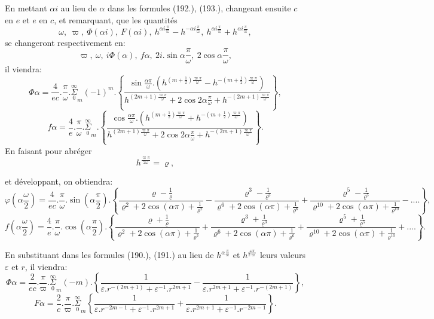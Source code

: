 \documentclass{article}
\begin{document}
En mettant $\alpha i$ au lieu de $\alpha$ dans les formules (192.), (193.), changeant ensuite $c$ en $e$ et $e$ en $c$, et remarquant, que les quantités
\[
\omega,\ \varpi,\ \Phi(\alpha i),\ F(\alpha i),\ h^{\alpha i\frac{\pi}{\varpi}}-h^{-\alpha i\frac{\pi}{\varpi}},\ h^{\alpha i\frac{\pi}{\varpi}}+h^{\alpha i\frac{\pi}{\varpi}},
\]
se changeront respectivement en:
\[
\varpi,\ \omega,\ i\Phi(\alpha),\ f\alpha,\ 2i.\sin\alpha\frac{\pi}{\omega},\ 2\cos\alpha\frac{\pi}{\omega},
\]
il viendra:
\[
\Phi\alpha = \frac{4}{ec}.\frac{\pi}{\omega}.\overset{\infty}{\underset{0}{\Sigma}}_{m}(-1)^{m}.\left\{\frac{\sin\frac{\alpha\pi}{\omega}.\left(h^{(m+\frac{1}{2})\frac{\varpi\pi}{\omega}}-h^{-(m+\frac{1}{2})\frac{\varpi\pi}{\omega}}\right)}{h^{(2m+1)\frac{\varpi\pi}{\omega}}+2\cos2\alpha\frac{\pi}{\omega}+h^{-(2m+1)\frac{\varpi\pi}{\omega}}}\right\},
\tag{197.}
\]
\[
f\alpha = \frac{4}{e}.\frac{\pi}{\omega}.\overset{\infty}{\underset{0}{\Sigma}}_{m}.\left\{\frac{\cos\frac{\alpha\pi}{\omega}.\left(h^{(m+\frac{1}{2})\frac{\varpi\pi}{\omega}}+h^{-(m+\frac{1}{2})\frac{\varpi\pi}{\omega}}\right)}{h^{(2m+1)\frac{\varpi\pi}{\omega}}+2\cos2\alpha\frac{\pi}{\omega}+h^{-(2m+1)\frac{\varpi\pi}{\omega}}}\right\}.
\tag{198.}
\]
En faisant pour abréger
\[
h^{\frac{\varpi\pi}{2\omega}} = \varrho,
\tag{199.}
\]

et développant, on obtiendra:
\[
\varphi\left(\alpha\frac{\omega}{2}\right) = \frac{4}{ec}.\frac{\pi}{\omega}.\sin\left(\alpha\frac{\pi}{2}\right).\left\{\frac{\varrho-\frac{1}{\varrho}}{\varrho^{2}+2\cos(\alpha\pi)+\frac{1}{\varrho^{2}}}-\frac{\varrho^{3}-\frac{1}{\varrho^{3}}}{\varrho^{6}+2\cos(\alpha\pi)+\frac{1}{\varrho^{6}}}+\frac{\varrho^{5}-\frac{1}{\varrho^{5}}}{\varrho^{10}+2\cos(\alpha\pi)+\frac{1}{\varrho^{10}}}-....\right\},
\tag{200.}
\]
\[
f\left(\alpha\frac{\omega}{2}\right) = \frac{4}{e}.\frac{\pi}{\omega}.\cos\left(\alpha\frac{\pi}{2}\right).\left\{\frac{\varrho+\frac{1}{\varrho}}{\varrho^{2}+2\cos(\alpha\pi)+\frac{1}{\varrho^{2}}}+\frac{\varrho^{3}+\frac{1}{\varrho^{3}}}{\varrho^{6}+2\cos(\alpha\pi)+\frac{1}{\varrho^{6}}}+\frac{\varrho^{5}+\frac{1}{\varrho^{5}}}{\varrho^{10}+2\cos(\alpha\pi)+\frac{1}{\varrho^{10}}}+....\right\}.
\tag{201.}
\]

En substituant dans les formules (190.), (191.) au lieu de $h^{\alpha\frac{\pi}{\varpi}}$ et $h^{\frac{\omega\pi}{2\varpi}}$ leurs valeurs $\varepsilon$ et $r$, il viendra:
\[
\Phi\alpha = \frac{2}{ec}.\frac{\pi}{\varpi}.\overset{\infty}{\underset{0}{\Sigma}}_{m}(-m).\left\{\frac{1}{\varepsilon.r^{-(2m+1)}+\varepsilon^{-1}.r^{2m+1}}-\frac{1}{\varepsilon.r^{2m+1}+\varepsilon^{-1}.r^{-(2m+1)}}\right\},
\tag{202.}
\]
\[
F\alpha = \frac{2}{c}.\frac{\pi}{\varpi}.\overset{\infty}{\underset{0}{\Sigma}}_{m}\left\{\frac{1}{\varepsilon.r^{-2m-1}+\varepsilon^{-1}.r^{2m+1}}+\frac{1}{\varepsilon.r^{2m+1}+\varepsilon^{-1}.r^{-2m-1}}\right\}.
\tag{203.}
\]
\end{document}
